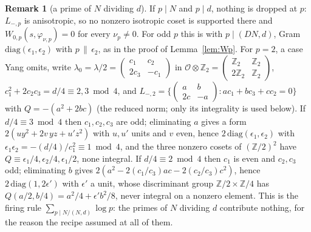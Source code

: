 \documentclass[11pt,reqno]{amsart}
\theoremstyle{plain}
\theoremstyle{definition}
\newtheorem{remark}[theorem]{Remark}
\newcommand{\Z}{\mathbb{Z}}
\begin{document}
\begin{remark}[a prime of $N$ dividing $d$]\label{rem:ramified}
If $p\mid N$ and $p\mid d$, nothing is dropped at $p$: $L_{-,p}$ is anisotropic, so no nonzero
isotropic coset is supported there and $W_{0,p}(s,\varphi_{\nu,p})=0$ for every $\nu_p\neq0$.
For odd $p$ this is \cite[Lemma~18(1)]{Yang} with $p\mid(DN,d)$, Gram
$\mathrm{diag}(\epsilon_1,\epsilon_2)$ with $p\,\|\,\epsilon_2$, as in the proof of
Lemma~\ref{lem:Wp}. For $p=2$, a case Yang omits, write $\lambda_0=\lambda/2=\begin{pmatrix}c_1&
c_2\\2c_3&-c_1\end{pmatrix}$ in $\mathcal O\otimes\Z_2=\begin{pmatrix}\Z_2&\Z_2\\2\Z_2&\Z_2
\end{pmatrix}$, $c_1^2+2c_2c_3=d/4\equiv2,3\bmod4$, and $L_{-,2}=\{\begin{pmatrix}a&b\\2c&-a
\end{pmatrix}:ac_1+bc_3+cc_2=0\}$ with $Q=-(a^2+2bc)$ (the reduced norm; only its integrality
is used below). If $d/4\equiv3\bmod4$ then $c_1,c_2,c_3$ are
odd; eliminating $a$ gives a form $2(uy^2+2v\,yz+u'z^2)$ with $u,u'$ units and $v$ even, hence
$2\,\mathrm{diag}(\epsilon_1,\epsilon_2)$ with $\epsilon_1\epsilon_2=-(d/4)/c_1^2\equiv1\bmod4$,
and the three nonzero cosets of $(\Z/2)^2$ have $Q\equiv\epsilon_1/4,\epsilon_2/4,\epsilon_1/2$,
none integral. If $d/4\equiv2\bmod4$ then $c_1$ is even and $c_2,c_3$ odd; eliminating $b$ gives
$2(a^2-2(c_1/c_3)ac-2(c_2/c_3)c^2)$, hence $2\,\mathrm{diag}(1,2\epsilon')$ with
$\epsilon'$ a unit, whose discriminant group $\Z/2\times\Z/4$ has $Q(a/2,b/4)=a^2/4+\epsilon'b^2/8$,
never integral on a nonzero element. This is the firing rule $\sum_{p\mid N/(N,d)}\log p$: the
primes of $N$ dividing $d$ contribute nothing, for the reason the recipe assumed at all of them.
\end{remark}
\end{document}
